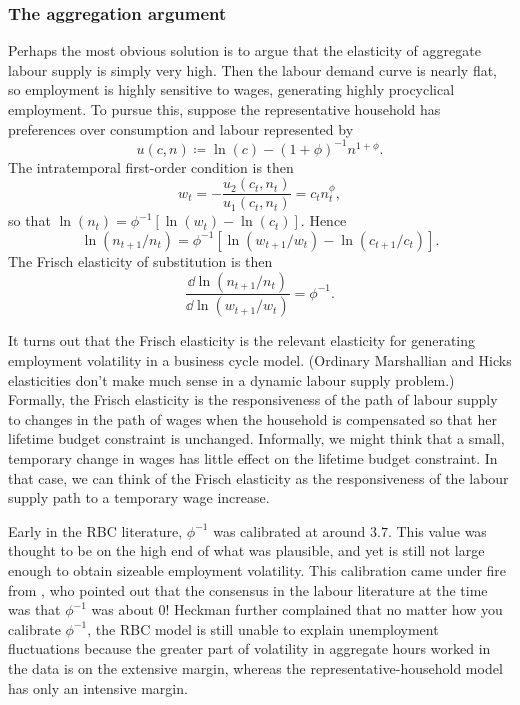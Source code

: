 \documentclass[11pt,letterpaper,reqno,oneside]{article}
\begin{document}
\subsubsection{The \texorpdfstring{\textcite{Rogerson1988}}{Rogerson (1988)} aggregation argument}
\label{sec:23Nov2015:resolving_emp_vol_puzzle:Rogerson1988}

Perhaps the most obvious solution is to argue that the elasticity of aggregate labour supply is simply very high. Then the labour demand curve is nearly flat, so employment is highly sensitive to wages, generating highly procyclical employment. To pursue this, suppose the representative household has preferences over consumption and labour represented by
%
\begin{equation*}
	u(c,n) \coloneqq \ln(c) - (1+\phi)^{-1} n^{1+\phi} .
\end{equation*}
%
The intratemporal first-order condition is then
%
\begin{equation*}
	w_t 
	= - \frac{u_2(c_t,n_t)}{u_1(c_t,n_t)}
	= c_t n_t^\phi ,
\end{equation*}
%
so that $\ln(n_t) = \phi^{-1} \left[ \ln(w_t) - \ln(c_t) \right]$. Hence
%
\begin{equation*}
	\ln(n_{t+1}/n_t) 
	= \phi^{-1} \left[ \ln(w_{t+1}/w_t) - \ln(c_{t+1}/c_t) \right] .
\end{equation*}
%
The Frisch elasticity of substitution is then
%
\begin{equation*}
	\frac{\dd \ln(n_{t+1}/n_t)}{\dd \ln(w_{t+1}/w_t)}
	= \phi^{-1} .
\end{equation*}


It turns out that the Frisch elasticity is the relevant elasticity for generating employment volatility in a business cycle model. (Ordinary Marshallian and Hicks elasticities don't make much sense in a dynamic labour supply problem.) Formally, the Frisch elasticity is the responsiveness of the path of labour supply to changes in the path of wages when the household is compensated so that her lifetime budget constraint is unchanged. Informally, we might think that a small, temporary change in wages has little effect on the lifetime budget constraint. In that case, we can think of the Frisch elasticity as the responsiveness of the labour supply path to a temporary wage increase.

Early in the RBC literature, $\phi^{-1}$ was calibrated at around $3.7$. This value was thought to be on the high end of what was plausible, and yet is still not large enough to obtain sizeable employment volatility. This calibration came under fire from \textcite{Heckman1984}, who pointed out that the consensus in the labour literature at the time was that $\phi^{-1}$ was about $0$! Heckman further complained that no matter how you calibrate $\phi^{-1}$, the RBC model is still unable to explain unemployment fluctuations because the greater part of volatility in aggregate hours worked in the data is on the extensive margin, whereas the representative-household model has only an intensive margin. 
\end{document}
